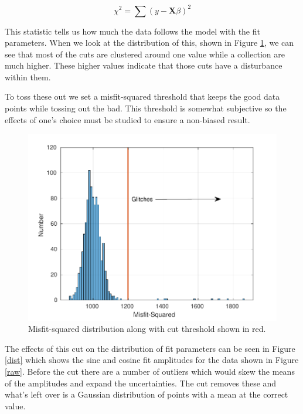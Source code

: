 \documentclass{article}
\begin{document}
\begin{equation}
\chi^2=\sum (y-\mathbf{X}\beta)^2
\end{equation}

This statistic tells us how much the data follows the model with the fit parameters. When we look at the distribution of this, shown in Figure \ref{cut}, we can see that most of the cuts are clustered around one value while a collection are much higher. These higher values indicate that those cuts have a disturbance within them. 

To toss these out we set a misfit-squared threshold that keeps the good data points while tossing out the bad. This threshold is somewhat subjective so the effects of one's choice must be studied to ensure a non-biased result. 

\begin{figure}[!h]
\begin{centering}
\includegraphics[width=\textwidth]{MisfitCut.pdf}
\caption{Misfit-squared distribution along with cut threshold shown in red.}\label{cut}
\end{centering}
\end{figure}

\pagebreak

The effects of this cut on the distribution of fit parameters can be seen in Figure \ref{dist} which shows the sine and cosine fit amplitudes for the data shown in Figure \ref{raw}. Before the cut there are a number of outliers which would skew the means of the amplitudes and expand the uncertainties. The cut removes these and what's left over is a Gaussian distribution of points with a mean at the correct value.
\end{document}
